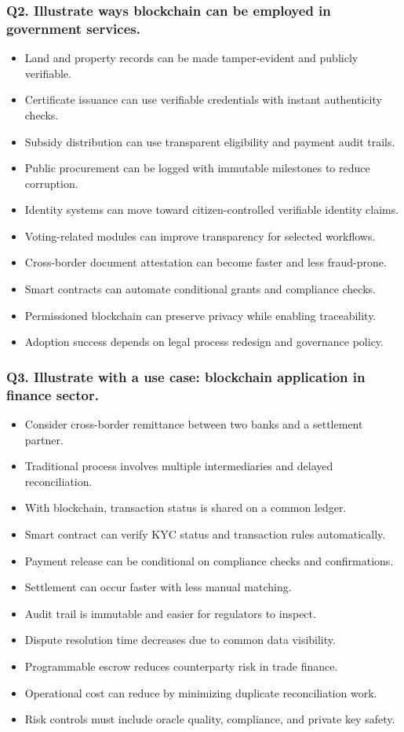\documentclass[12pt,a4paper]{article}
\begin{document}
\subsubsection*{Q2. Illustrate ways blockchain can be employed in government services.}
\begin{itemize}
\item Land and property records can be made tamper-evident and publicly verifiable.
\item Certificate issuance can use verifiable credentials with instant authenticity checks.
\item Subsidy distribution can use transparent eligibility and payment audit trails.
\item Public procurement can be logged with immutable milestones to reduce corruption.
\item Identity systems can move toward citizen-controlled verifiable identity claims.
\item Voting-related modules can improve transparency for selected workflows.
\item Cross-border document attestation can become faster and less fraud-prone.
\item Smart contracts can automate conditional grants and compliance checks.
\item Permissioned blockchain can preserve privacy while enabling traceability.
\item Adoption success depends on legal process redesign and governance policy.
\end{itemize}

\subsubsection*{Q3. Illustrate with a use case: blockchain application in finance sector.}
\begin{itemize}
\item Consider cross-border remittance between two banks and a settlement partner.
\item Traditional process involves multiple intermediaries and delayed reconciliation.
\item With blockchain, transaction status is shared on a common ledger.
\item Smart contract can verify KYC status and transaction rules automatically.
\item Payment release can be conditional on compliance checks and confirmations.
\item Settlement can occur faster with less manual matching.
\item Audit trail is immutable and easier for regulators to inspect.
\item Dispute resolution time decreases due to common data visibility.
\item Programmable escrow reduces counterparty risk in trade finance.
\item Operational cost can reduce by minimizing duplicate reconciliation work.
\item Risk controls must include oracle quality, compliance, and private key safety.
\end{itemize}
\end{document}
